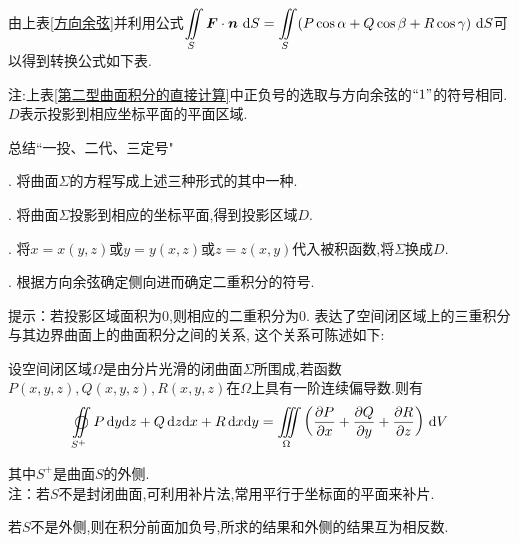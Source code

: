 \ttheorem[直接转换为二重积分计算]
由上表\ref{方向余弦}并利用公式$\displaystyle \iint\limits_{S}\bm{F}\cdot \bm{n}\,\,{\rm{d}} S=\iint\limits_{S}(P\cos \alpha +Q\cos \beta +R\cos \gamma )\,\,{\rm{d}} S$可以得到转换公式如下表.
\begin{table}[h]
	\centering
	\renewcommand{\arraystretch}{1.6}
	\caption{转换为二重积分计算的计算公式}
	\renewcommand{\arraystretch}{1}
	\label{第二型曲面积分的直接计算}
\end{table} 
\par 注:上表\ref{第二型曲面积分的直接计算}中正负号的选取与方向余弦的$``1"$的符号相同.$D$表示投影到相应坐标平面的平面区域.

\inference[转换为二重积分计算第二型曲面积分]
\noindent \quad 总结\quad ``一投、二代、三定号"
\par {}. 将曲面$\Sigma$的方程写成上述三种形式的其中一种.
\par {}. 将曲面$\Sigma$投影到相应的坐标平面,得到投影区域$D$.
\par {}. 将$x=x(y,z)$或$y=y(x,z)$或$z=z(x,y)$代入被积函数,将$\Sigma $换成$D$.
\par {}. 根据方向余弦确定侧向进而确定二重积分的符号.

\quad 提示：若投影区域面积为0,则相应的二重积分为0.
\newpage
\theorem[高斯公式]
表达了空间闭区域上的三重积分与其边界曲面上的曲面积分之间的关系, 这个关系可陈述如下:
\par 设空间闭区域$\Omega $是由分片光滑的闭曲面$\Sigma $所围成,若函数$P(x, y, z),Q(x, y, z),R(x, y, z)$在$\Omega $上具有一阶连续偏导数.则有
\begin{equation}
\oiint\limits_{S^+}P \,\d y\d z+Q\,\d z\d x+R\,\d x\d y=\iiint\limits_{\Omega}\left( \frac{\partial P}{\partial x}+\frac{\partial Q}{\partial y}+\frac{\partial R}{\partial z}\right)\,\d V 
\end{equation}
\par 其中$S^+$是曲面$S$的外侧.\\
注：若$S$不是封闭曲面,可利用补片法,常用平行于坐标面的平面来补片.
\par 若$S$不是外侧,则在积分前面加负号,所求的结果和外侧的结果互为相反数.

